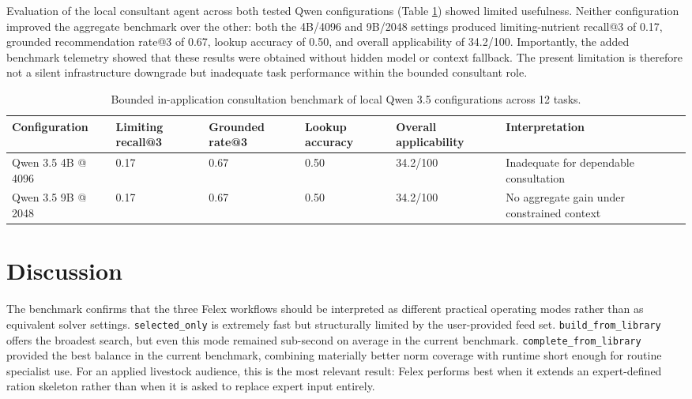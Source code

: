 \documentclass[a4paper,fleqn]{cas-dc}
\begin{document}
Evaluation of the local consultant agent across both tested Qwen configurations (Table \ref{tab:llm-eval}) showed limited usefulness. Neither configuration improved the aggregate benchmark over the other: both the 4B/4096 and 9B/2048 settings produced limiting-nutrient recall@3 of 0.17, grounded recommendation rate@3 of 0.67, lookup accuracy of 0.50, and overall applicability of 34.2/100. Importantly, the added benchmark telemetry showed that these results were obtained without hidden model or context fallback. The present limitation is therefore not a silent infrastructure downgrade but inadequate task performance within the bounded consultant role.

\begin{table}[htbp]
\caption{Bounded in-application consultation benchmark of local Qwen 3.5 configurations across 12 tasks.}\label{tab:llm-eval}
\begin{tabular*}{\textwidth}{@{\extracolsep{\fill}}llllll@{}}
\toprule
Configuration & Limiting recall@3 & Grounded rate@3 & Lookup accuracy & Overall applicability & Interpretation \\
\midrule
Qwen 3.5 4B @ 4096 & 0.17 & 0.67 & 0.50 & 34.2/100 & Inadequate for dependable consultation \\
Qwen 3.5 9B @ 2048 & 0.17 & 0.67 & 0.50 & 34.2/100 & No aggregate gain under constrained context \\
\bottomrule
\end{tabular*}
\end{table}

\section{Discussion}\label{sec:discussion}

The benchmark confirms that the three Felex workflows should be interpreted as different practical operating modes rather than as equivalent solver settings. \texttt{selected\_only} is extremely fast but structurally limited by the user-provided feed set. \texttt{build\_from\_library} offers the broadest search, but even this mode remained sub-second on average in the current benchmark. \texttt{complete\_from\_library} provided the best balance in the current benchmark, combining materially better norm coverage with runtime short enough for routine specialist use. For an applied livestock audience, this is the most relevant result: Felex performs best when it extends an expert-defined ration skeleton rather than when it is asked to replace expert input entirely.
\end{document}
